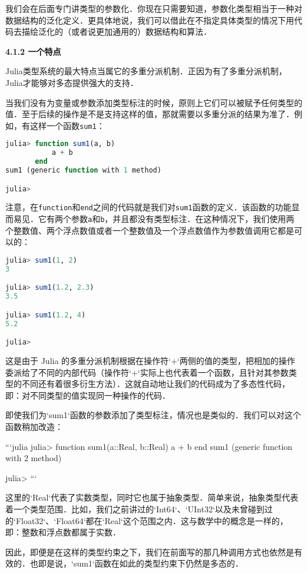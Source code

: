 我们会在后面专门讲类型的参数化．你现在只需要知道，参数化类型相当于一种对数据结构的泛化定义．更具体地说，我们可以借此在不指定具体类型的情况下用代码去描绘泛化的（或者说更加通用的）数据结构和算法．

\textbf{4.1.2 一个特点}

Julia类型系统的最大特点当属它的多重分派机制．正因为有了多重分派机制，Julia才能够对多态提供强大的支持．

当我们没有为变量或参数添加类型标注的时候，原则上它们可以被赋予任何类型的值．至于后续的操作是不是支持这样的值，那就需要以多重分派的结果为准了．例如，有这样一个函数\verb|sum1|：

\begin{lstlisting}[language=julia]
julia> function sum1(a, b)
           a + b
       end
sum1 (generic function with 1 method)

julia> 
\end{lstlisting}

注意，在\verb|function|和\verb|end|之间的代码就是我们对\verb|sum1|函数的定义．该函数的功能显而易见．它有两个参数\verb|a|和\verb|b|，并且都没有类型标注．在这种情况下，我们使用两个整数值、两个浮点数值或者一个整数值及一个浮点数值作为参数值调用它都是可以的：

\begin{lstlisting}[language=julia]
julia> sum1(1, 2)
3

julia> sum1(1.2, 2.3)
3.5

julia> sum1(1.2, 4)
5.2

julia> 
\end{lstlisting}

这是由于 Julia 的多重分派机制根据在操作符`+`两侧的值的类型，把相加的操作委派给了不同的内部代码（操作符`+`实际上也代表着一个函数，且针对其参数类型的不同还有着很多衍生方法）．这就自动地让我们的代码成为了多态性代码，即：对不同类型的值实现同一种操作的代码．

即使我们为`sum1`函数的参数添加了类型标注，情况也是类似的．我们可以对这个函数稍加改造：

```julia
julia> function sum1(a::Real, b::Real)
           a + b
       end
sum1 (generic function with 2 method)

julia> 
```

这里的`Real`代表了实数类型，同时它也属于抽象类型．简单来说，抽象类型代表着一个类型范围．比如，我们之前讲过的`Int64`、`UInt32`以及未曾碰到过的`Float32`、`Float64`都在`Real`这个范围之内．这与数学中的概念是一样的，即：整数和浮点数都属于实数．

因此，即便是在这样的类型约束之下，我们在前面写的那几种调用方式也依然是有效的．也即是说，`sum1`函数在如此的类型约束下仍然是多态的．


